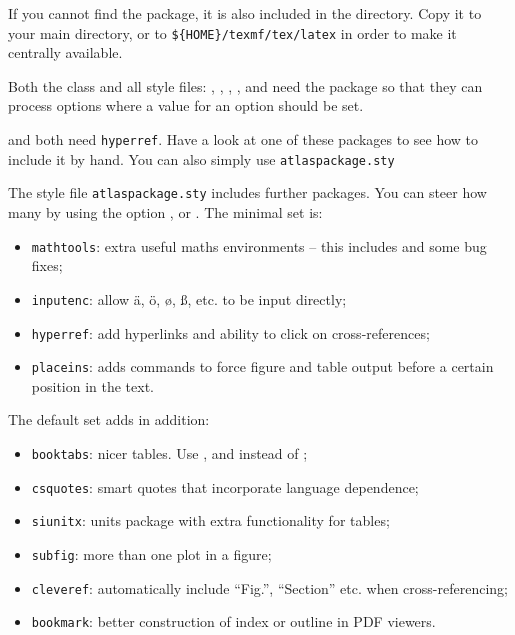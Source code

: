 If you cannot find the  package, it is also included in the  directory.
Copy it to your main directory, or to \verb|${HOME}/texmf/tex/latex| in order to make
it centrally available.

Both the class  and all style files:
, , , , 
and  need the package  
so that they can process options where a value for an option should be set.

 and  both need \texttt{hyperref}. 
Have a look at one of these packages to see how to include it by hand.
You can also simply use \texttt{atlaspackage.sty}

The style file \texttt{atlaspackage.sty} includes further packages.
You can steer how many by using the option ,  or .
The minimal set is:
\begin{itemize}\setlength{\parskip}{0pt}\setlength{\itemsep}{0pt}
\item \texttt{mathtools}: extra useful maths environments -- this includes  and some bug fixes;
\item \texttt{inputenc}: allow ä, ö, ø, ß, etc. to be input directly;
\item \texttt{hyperref}: add hyperlinks and ability to click on cross-references;
\item \texttt{placeins}: adds commands to force figure and table output before a certain position in the text.
\end{itemize}

The default set adds in addition:
\begin{itemize}\setlength{\parskip}{0pt}\setlength{\itemsep}{0pt}
\item \texttt{booktabs}: nicer tables. Use ,  and  instead of ;
\item \texttt{csquotes}: smart quotes that incorporate language dependence;
\item \texttt{siunitx}: units package with extra functionality for tables;
\item \texttt{subfig}: more than one plot in a figure;
\item \texttt{cleveref}: automatically include \enquote{Fig.}, \enquote{Section} etc. when cross-referencing;
\item \texttt{bookmark}: better construction of index or outline in PDF viewers.
\end{itemize}

